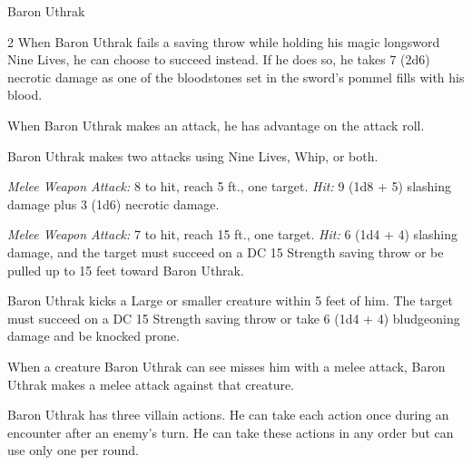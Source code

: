 \documentclass[10pt,a4paper,twoside,bg=print,twocolumn,openany,nodeprecatedcode]{dndbook}
\begin{document}
\begin{DndMonster}[float*=b,width=\textwidth + 8pt]{Baron Uthrak}
\begin{multicols}{2}
\DndMonsterBasics[
armor-class = {16 (half plate armor)},
hit-points = {\DndDice{17d8 + 68}},
speed = {30 ft.}
]
\DndMonsterAbilityScores[
 str = 19,
 dex = 12,
 con = 19,
 int = 14,
 wis = 14,
 cha = 16
]
\DndMonsterDetails[
saving-throws = {Str +7, Con +7},
skills = {Athletics +10, Deception +6, Insight +5, Intimidation +9, Perception +5},
languages = {Common},
challenge = 7,
]
When Baron Uthrak fails a saving throw while holding his magic longsword Nine Lives, he can choose to succeed instead. If he does so, he takes 7 (2d6) necrotic damage as one of the bloodstones set in the sword's pommel fills with his blood.

When Baron Uthrak makes an attack, he has advantage on the attack roll.

Baron Uthrak makes two attacks using Nine Lives, Whip, or both.

\textsl{Melee Weapon Attack:} 8 to hit, reach 5 ft., one target. \textsl{Hit:} 9 (1d8 + 5) slashing damage plus 3 (1d6) necrotic damage.

\textsl{Melee Weapon Attack:} 7 to hit, reach 15 ft., one target. \textsl{Hit:} 6 (1d4 + 4) slashing damage, and the target must succeed on a DC 15 Strength saving throw or be pulled up to 15 feet toward Baron Uthrak.

Baron Uthrak kicks a Large or smaller creature within 5 feet of him. The target must succeed on a DC 15 Strength saving throw or take 6 (1d4 + 4) bludgeoning damage and be knocked prone.

When a creature Baron Uthrak can see misses him with a melee attack, Baron Uthrak makes a melee attack against that creature.

Baron Uthrak has three villain actions. He can take each action once during an encounter after an enemy's turn. He can take these actions in any order but can use only one per round.


\end{multicols}
\end{DndMonster}
\end{document}

